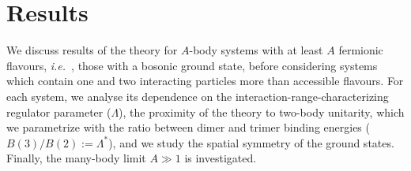 \documentclass[preprint,12pt]{elsarticle}
\newcommand{\ie}{\textit{i.e.}~}
\begin{document}
\section{Results}

We discuss results of the theory for $A$-body systems with at least $A$ fermionic
flavours, \ie, those with a bosonic ground state, before considering systems
which contain one and two interacting particles more than accessible flavours.
For each system, we analyse its dependence on the interaction-range-characterizing
regulator parameter ($\Lambda$), the proximity of the theory to two-body unitarity, which we parametrize with the ratio between dimer and trimer binding energies
($B(3)/B(2):=\Lambda^*$), and we study the spatial symmetry of the ground states.
Finally, the many-body limit $A\gg1$ is investigated.
\end{document}
